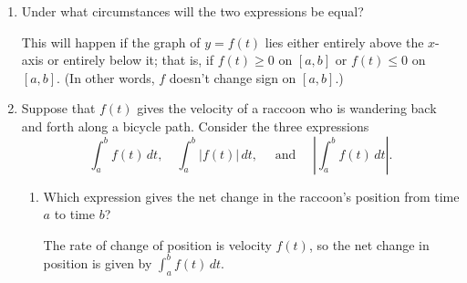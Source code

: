 \documentclass{article}
\begin{document}
\begin{enumerate}
\begin{enumerate}
\begin{solution}
\begin{center}
\begin{tabular}{ccc}
          $\displaystyle \int_a^b |f(t)|\,dt$           
        \end{tabular}
      \end{center}
      As we can see, both integrals involve the same-sized regions, but in
      $\displaystyle \int_a^b |f(t)|\,dt$, every region contributes
      positive signed area.  In $\displaystyle \int_a^b f(t)\,dt$, some
      regions may contribute positive signed area while others contribute
      negative signed area; therefore, even when we take the absolute
      value of $\displaystyle \int_a^b f(t)\,dt$, it can never be bigger
      than $\displaystyle \int_a^b |f(t)|\,dt$.  That is, $\boxed{
        \int_a^b |f(t)| \, dt \geq \left| \int_a^b f(t) \, dt \right|}$.
    \end{solution}

  \item
    \begin{problem}[\vfill]
      Under what circumstances will the two expressions be equal?
    \end{problem}

    \begin{solution} %
      This will happen if the graph of $y = f(t)$ lies either entirely
      above the $x$-axis or entirely below it; that is, if $f(t) \geq 0$
      on $[a, b]$ or $f(t) \leq 0$ on $[a, b]$.  (In other words, $f$
      doesn't change sign on $[a, b]$.)
    \end{solution}

  \item Suppose that $f(t)$ gives the velocity of a raccoon who is
    wandering back and forth along a bicycle path.  Consider the three
    expressions
    \begin{equation*}
      \int_{a}^{b} f(t)\,dt, 
      \quad 
      \int_{a}^{b} |f(t) |\,dt,
      \quad \text{ and }\quad
      \left|\int_{a}^{b} f(t)\,dt\right|.
    \end{equation*}

    \begin{enumerate}
    \item
      \begin{problem}[\stretch{0.5}]
        Which expression gives the net change in the raccoon's position
        from time $a$ to time $b$?
      \end{problem}

      \begin{solution} 
        The rate of change of position is velocity $f(t)$, so the net
        change in position is given by $\displaystyle \int_a^b f(t) \,
        dt$.
      \end{solution}


\end{enumerate}
\end{enumerate}
\end{enumerate}
\end{document}
